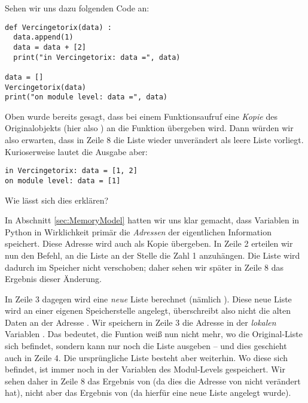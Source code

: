 Sehen wir uns dazu folgenden Code an:
\begin{codebox}
\begin{verbatim}
def Vercingetorix(data) :
  data.append(1)
  data = data + [2]
  print("in Vercingetorix: data =", data)

data = []
Vercingetorix(data)
print("on module level: data =", data)
\end{verbatim}
\end{codebox}
Oben wurde bereits gesagt, dass bei einem Funktionsaufruf eine \emph{Kopie} des Originalobjekts (hier also ) an die Funktion übergeben wird. Dann würden wir also erwarten, dass in Zeile 8 die Liste  wieder unverändert als leere Liste vorliegt. Kurioserweise lautet die Ausgabe aber:

\begin{cmdbox}
\begin{verbatim}
in Vercingetorix: data = [1, 2]
on module level: data = [1]
\end{verbatim}
\end{cmdbox}

Wie lässt sich dies erklären?

In Abschnitt \ref{sec:MemoryModel} hatten wir uns klar gemacht, dass Variablen in Python in Wirklichkeit primär die \emph{Adressen} der eigentlichen Information speichert. Diese Adresse wird auch als Kopie übergeben. In Zeile 2 erteilen wir nun den Befehl, an die Liste an der Stelle  die Zahl 1 anzuhängen. Die Liste wird dadurch im Speicher nicht verschoben; daher sehen wir später in Zeile 8 das Ergebnis dieser Änderung.

In Zeile 3 dagegen wird eine \emph{neue} Liste berechnet (nämlich \inPy{[1, 2]}). Diese neue Liste wird an einer eigenen Speicherstelle angelegt, überschreibt also nicht die alten Daten an der Adresse . Wir speichern in Zeile 3 die Adresse in der \emph{lokalen} Variablen . Das bedeutet, die Funtion  weiß nun nicht mehr, wo die Original-Liste sich befindet, sondern kann nur noch die Liste \inPy{[1 ,2]} ausgeben -- und dies geschieht auch in Zeile 4. Die ursprüngliche Liste besteht aber weiterhin. Wo diese sich befindet, ist immer noch in der Variablen  des Modul-Levels gespeichert. Wir sehen daher in Zeile 8 das Ergebnis von  (da dies die Adresse von  nicht verändert hat), nicht aber das Ergebnis von  (da hierfür eine neue Liste angelegt wurde).

